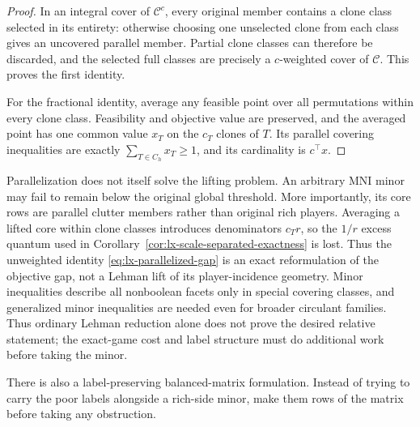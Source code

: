 \begin{proof}
In an integral cover of $\mathcal C^c$, every original member contains a
clone class selected in its entirety: otherwise choosing one unselected clone
from each class gives an uncovered parallel member.  Partial clone classes
can therefore be discarded, and the selected full classes are precisely a
$c$-weighted cover of $\mathcal C$.  This proves the first identity.

For the fractional identity, average any feasible point over all
permutations within every clone class.  Feasibility and objective value are
preserved, and the averaged point has one common value $x_T$ on the
$c_T$ clones of $T$.  Its parallel covering inequalities are exactly
$\sum_{T\in C_h}x_T\geq1$, and its cardinality is $c^\top x$.
\end{proof}

Parallelization does not itself solve the lifting problem.  An arbitrary MNI
minor may fail to remain below the original global threshold.  More
importantly, its core rows are parallel clutter members rather than original
rich players.  Averaging a lifted core within clone classes introduces
denominators $c_T r$, so the $1/r$ excess quantum used in
Corollary~\ref{cor:lx-scale-separated-exactness} is lost.  Thus the
unweighted identity \eqref{eq:lx-parallelized-gap} is an exact reformulation
of the objective gap, not a Lehman lift of its player-incidence geometry.
Minor inequalities describe all nonboolean facets only in special covering
classes, and generalized minor inequalities are needed even for broader
circulant families.  Thus ordinary Lehman reduction alone does not prove
the desired relative statement; the exact-game cost and label structure must
do additional work before taking the minor.

There is also a label-preserving balanced-matrix formulation.  Instead of
trying to carry the poor labels alongside a rich-side minor, make them rows
of the matrix before taking any obstruction.

